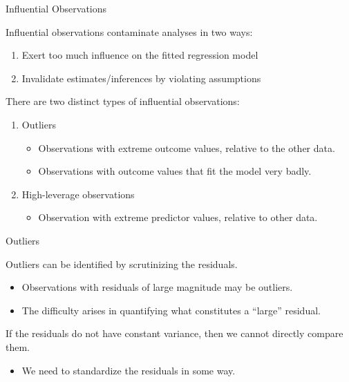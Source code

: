 \documentclass{beamer}\usepackage[]{graphicx}\usepackage[]{color}
\begin{document}

\begin{frame}{Influential Observations}
  
  Influential observations contaminate analyses in two ways:
  \vc
  \begin{enumerate}
  \item Exert too much influence on the fitted regression model
    \vc
  \item Invalidate estimates/inferences by violating assumptions
  \end{enumerate}
  \vb
  There are two distinct types of influential observations:
  \vc
  \begin{enumerate}
  \item Outliers
    \vc
    \begin{itemize}
    \item Observations with extreme outcome values, relative to the other data.
      \vc
    \item Observations with outcome values that fit the model very badly.
    \end{itemize}
    \vb
  \item High-leverage observations
    \vc
    \begin{itemize}
    \item Observation with extreme predictor values, relative to other data.
    \end{itemize}
  \end{enumerate}
  
\end{frame}
    

\begin{frame}{Outliers}
  
  Outliers can be identified by scrutinizing the residuals.
  \vc
  \begin{itemize}
  \item Observations with residuals of large magnitude may be outliers.
    \vc
  \item The difficulty arises in quantifying what constitutes a ``large'' 
    residual.
  \end{itemize}
  \vb 
  If the residuals do not have constant variance, then we cannot directly 
  compare them.
  \vc
  \begin{itemize}
  \item We need to standardize the residuals in some way.
  \end{itemize}
  
\end{frame}
\end{document}
